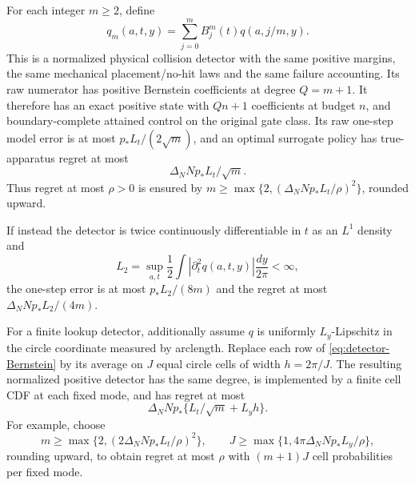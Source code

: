 \begin{theorem}\label{thm:hierarchy}
For each integer $m\ge2$, define
\begin{equation}
 q_m(a,t,y)=\sum_{j=0}^m B_j^m(t)q(a,j/m,y).
 \label{eq:detector-Bernstein}
\end{equation}
This is a normalized physical collision detector with the same positive margins, the same mechanical placement/no-hit laws and the same failure accounting. Its raw numerator has positive Bernstein coefficients at degree $Q=m+1$. It therefore has an exact positive state with $Qn+1$ coefficients at budget $n$, and boundary-complete attained control on the original gate class. Its raw one-step model error is at most $p_*L_t/(2\sqrt m)$, and an optimal surrogate policy has true-apparatus regret at most
\begin{equation}
 \Delta_N Np_*L_t/\sqrt m.
 \label{eq:degree-regret}
\end{equation}
Thus regret at most $\rho>0$ is ensured by
$m\ge\max\{2,(\Delta_NNp_*L_t/\rho)^2\}$, rounded upward.

If instead the detector is twice continuously differentiable in $t$ as an $L^1$ density and
\[
 L_2=\sup_{a,t}\frac12\int|\partial_t^2q(a,t,y)|\frac{dy}{2\pi}<\infty,
\]
the one-step error is at most $p_*L_2/(8m)$ and the regret at most $\Delta_NNp_*L_2/(4m)$.

For a finite lookup detector, additionally assume $q$ is uniformly $L_y$-Lipschitz in the circle coordinate measured by arclength. Replace each row of \eqref{eq:detector-Bernstein} by its average on $J$ equal circle cells of width $h=2\pi/J$. The resulting normalized positive detector has the same degree, is implemented by a finite cell CDF at each fixed mode, and has regret at most
\begin{equation}
 \Delta_NNp_*\{L_t/\sqrt m+L_yh\}.
 \label{eq:lookup-regret}
\end{equation}
For example, choose
\[
 m\ge\max\{2,(2\Delta_NNp_*L_t/\rho)^2\},\qquad
 J\ge\max\{1,4\pi\Delta_NNp_*L_y/\rho\},
\]
rounding upward, to obtain regret at most $\rho$ with $(m+1)J$ cell probabilities per fixed mode.
\end{theorem}
